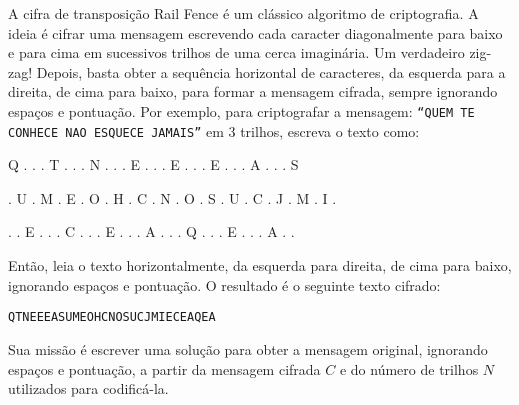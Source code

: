 A cifra de transposição Rail Fence é um clássico algoritmo de criptografia. A ideia é cifrar uma mensagem escrevendo cada caracter diagonalmente
para baixo e para cima em sucessivos trilhos de uma cerca imaginária.
Um verdadeiro zig-zag!
Depois, basta obter a sequência horizontal de caracteres, da esquerda para a direita, de cima para baixo, para formar a mensagem cifrada, sempre
ignorando espaços e pontuação.
Por exemplo, para criptografar a mensagem: \texttt{“QUEM TE CONHECE NAO ESQUECE JAMAIS”} em 3 trilhos, escreva o texto como:




\begin{center}
\small
\begin{verb} 
Q  .  .  .  T  .  .  .  N  .  .  .  E  .  .  .  E  .  .  .  E  .  .  .  A  .  .  .  S
\end{verb} 
\begin{verb}
.  U  .  M  .  E  .  O  .  H  .  C  .  N  .  O  .  S  .  U  .  C  .  J  .  M  .  I  . 
\end{verb} 
\begin{verb}
.  .  E  .  .  .  C  .  .  .  E  .  .  .  A  .  .  .  Q  .  .  .  E  .  .  .  A  .  . 
\end{verb}
\end{center}


\normalsize
Então, leia o texto horizontalmente, da esquerda para direita, de cima para baixo, ignorando espaços e pontuação. O resultado é o seguinte texto cifrado:

\begin{verbatim}
QTNEEEASUMEOHCNOSUCJMIECEAQEA
\end{verbatim}

Sua missão é escrever uma solução para obter a mensagem original, ignorando espaços e pontuação, a partir da mensagem cifrada $C$ e do número de trilhos
$N$ utilizados para codificá-la.


